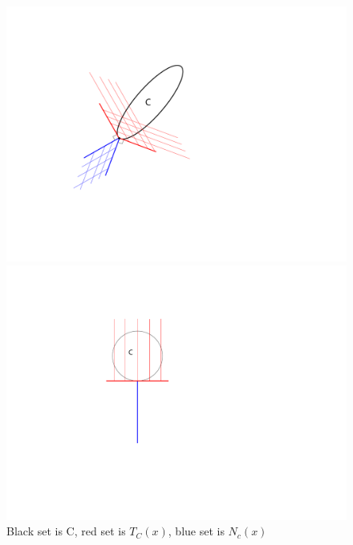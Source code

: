 \begin{figure}[h!]
    \vspace{-3cm}
    \hspace{-5cm}
    \begin{minipage}{0.45\textwidth}
        \includegraphics[width=3\textwidth]{figures/lecture13-normal_tangent_cone.pdf} %
    \end{minipage}\hfill
    \begin{minipage}{0.45\textwidth}
        \includegraphics[width=3\textwidth]{figures/lecture13-normal_tangent2.pdf} %
    \end{minipage}
    \hspace{5cm}
    \vspace{-5cm}
    \caption{Black set is C, red set is $T_C(x)$, blue set is $N_c(x)$}
\end{figure}


